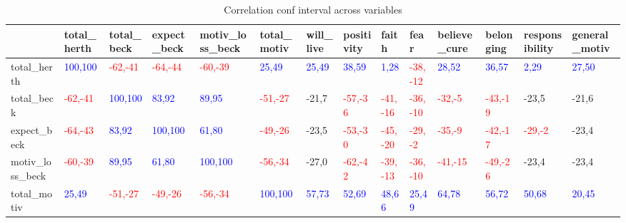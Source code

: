 \begin{table}[H] 
\tiny 
 \caption{Correlation conf interval across variables} 
 \label{correlation_conf_interval_across_variables} 
 \centering 
 \begin{adjustbox}{angle=270}  
 \begin{tabular} {|l|l|l|l|l|l|l|l|l|l|l|l|l|l|}  
 \hline 
  &  total\_herth & total\_beck & expect\_beck & motiv\_loss\_beck & total\_motiv & will\_live & positivity & faith & fear & believe\_cure & belonging & responsibility & general\_motiv \\ 
 \hline 
 total\_herth & {\textcolor{blue}{100,100}} & {\textcolor{red}{-62,-41}} & {\textcolor{red}{-64,-44}} & {\textcolor{red}{-60,-39}} & {\textcolor{blue}{25,49}} & {\textcolor{blue}{25,49}} & {\textcolor{blue}{38,59}} & {\textcolor{blue}{1,28}} & {\textcolor{red}{-38,-12}} & {\textcolor{blue}{28,52}} & {\textcolor{blue}{36,57}} & {\textcolor{blue}{2,29}} & {\textcolor{blue}{27,50}} \\ 
 \hline 
 total\_beck & {\textcolor{red}{-62,-41}} & {\textcolor{blue}{100,100}} & {\textcolor{blue}{83,92}} & {\textcolor{blue}{89,95}} & {\textcolor{red}{-51,-27}} & -21,7 & {\textcolor{red}{-57,-36}} & {\textcolor{red}{-41,-16}} & {\textcolor{red}{-36,-10}} & {\textcolor{red}{-32,-5}} & {\textcolor{red}{-43,-19}} & -23,5 & -21,6 \\ 
 \hline 
 expect\_beck & {\textcolor{red}{-64,-43}} & {\textcolor{blue}{83,92}} & {\textcolor{blue}{100,100}} & {\textcolor{blue}{61,80}} & {\textcolor{red}{-49,-26}} & -23,5 & {\textcolor{red}{-53,-30}} & {\textcolor{red}{-45,-20}} & {\textcolor{red}{-29,-2}} & {\textcolor{red}{-35,-9}} & {\textcolor{red}{-42,-17}} & {\textcolor{red}{-29,-2}} & -23,4 \\ 
 \hline 
 motiv\_loss\_beck & {\textcolor{red}{-60,-39}} & {\textcolor{blue}{89,95}} & {\textcolor{blue}{61,80}} & {\textcolor{blue}{100,100}} & {\textcolor{red}{-56,-34}} & -27,0 & {\textcolor{red}{-62,-42}} & {\textcolor{red}{-39,-13}} & {\textcolor{red}{-36,-10}} & {\textcolor{red}{-41,-15}} & {\textcolor{red}{-49,-26}} & -23,4 & -23,4 \\ 
 \hline 
 total\_motiv & {\textcolor{blue}{25,49}} & {\textcolor{red}{-51,-27}} & {\textcolor{red}{-49,-26}} & {\textcolor{red}{-56,-34}} & {\textcolor{blue}{100,100}} & {\textcolor{blue}{57,73}} & {\textcolor{blue}{52,69}} & {\textcolor{blue}{48,66}} & {\textcolor{blue}{25,49}} & {\textcolor{blue}{64,78}} & {\textcolor{blue}{56,72}} & {\textcolor{blue}{50,68}} & {\textcolor{blue}{20,45}} \\ 

\end{tabular}
\end{adjustbox}
\end{table}
